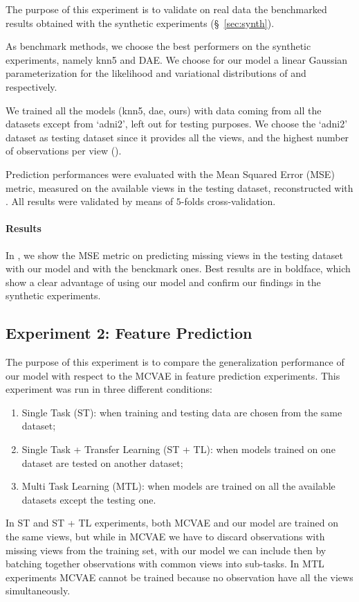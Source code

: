 The purpose of this experiment is to validate on real data the benchmarked results obtained with the synthetic experiments (\S~\ref{sec:synth}).

As benchmark methods, we choose the best performers on the synthetic experiments, namely knn5 and DAE.
We choose for our model a linear Gaussian parameterization for the likelihood and variational distributions of  and  respectively.

We trained all the models (knn5, dae, ours) with data coming from all the datasets except from `adni2', left out for testing purposes.
We choose the `adni2' dataset as testing dataset since it provides all the views, and the highest number of observations per view ().

Prediction performances were evaluated with the Mean Squared Error (MSE) metric, measured on the available views in the testing dataset, reconstructed with .
All results were validated by means of $5$-folds cross-validation.

\paragraph{Results}
In , we show the MSE metric on predicting missing views in the testing dataset with our model and with the benckmark ones.
Best results are in boldface, which show a clear advantage of using our model and confirm our findings in the synthetic experiments.

\subsection{Experiment 2: Feature Prediction}
\label{ssec:feats}

The purpose of this experiment is to compare the generalization performance of our model with respect to the MCVAE in feature prediction experiments.
This experiment was run in three different conditions:
%
\begin{enumerate}
\item Single Task (ST): when training and testing data are chosen from the same dataset;
%
\item Single Task + Transfer Learning (ST + TL): when models trained on one dataset are tested on another dataset;
%
\item Multi Task Learning (MTL): when models are trained on all the available datasets except the testing one.
%
\end{enumerate}
%
In ST and ST + TL experiments, both MCVAE and our model are trained on the same views,
but while in MCVAE we have to discard observations with missing views from the training set, with our model we can include then by batching together observations with common views into sub-tasks.
In MTL experiments MCVAE cannot be trained because no observation have all the views simultaneously.

